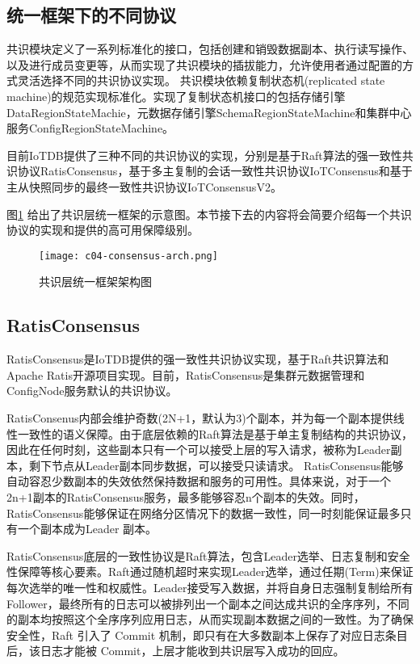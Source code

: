 \subsection{统一框架下的不同协议}

共识模块定义了一系列标准化的接口，包括创建和销毁数据副本、执行读写操作、以及进行成员变更等，从而实现了共识模块的插拔能力，允许使用者通过配置的方式灵活选择不同的共识协议实现。
共识模块依赖复制状态机\cite{lamport1978statemachine}(replicated state machine)的规范实现标准化。实现了复制状态机接口的包括存储引擎DataRegionStateMachie，元数据存储引擎SchemaRegionStateMachine和集群中心服务ConfigRegionStateMachine。

目前IoTDB提供了三种不同的共识协议的实现，分别是基于Raft算法的强一致性共识协议RatisConsensus，基于多主复制的会话一致性共识协议IoTConsensus和基于主从快照同步的最终一致性共识协议IoTConsensusV2。

图\ref{fig:c04-consensus-arch} 给出了共识层统一框架的示意图。本节接下去的内容将会简要介绍每一个共识协议的实现和提供的高可用保障级别。

\begin{figure}
  \centering
  \texttt{[image: c04-consensus-arch.png]}
  \caption{共识层统一框架架构图}
  \label{fig:c04-consensus-arch}
\end{figure}


\subsection{RatisConsensus}

RatisConsensus是IoTDB提供的强一致性共识协议实现，基于Raft共识算法和Apache Ratis\cite{ratis}开源项目实现。目前，RatisConsensus是集群元数据管理和ConfigNode服务默认的共识协议。

RatisConsenus内部会维护奇数(2N+1，默认为3)个副本，并为每一个副本提供线性一致性的语义保障。由于底层依赖的Raft算法是基于单主复制结构的共识协议，因此在任何时刻，这些副本只有一个可以接受上层的写入请求，被称为Leader副本，剩下节点从Leader副本同步数据，可以接受只读请求。
RatisConsensus能够自动容忍少数副本的失效依然保持数据和服务的可用性。具体来说，对于一个2n+1副本的RatisConsensus服务，最多能够容忍n个副本的失效。同时，RatisConsensus能够保证在网络分区情况下的数据一致性，同一时刻能保证最多只有一个副本成为Leader 副本。

RatisConsensus底层的一致性协议是Raft算法，包含Leader选举、日志复制和安全性保障等核心要素。Raft通过随机超时来实现Leader选举，通过任期(Term)来保证每次选举的唯一性和权威性。Leader接受写入数据，并将自身日志强制复制给所有Follower，最终所有的日志可以被排列出一个副本之间达成共识的全序序列，不同的副本均按照这个全序序列应用日志，从而实现副本数据之间的一致性。为了确保安全性，Raft 引入了 Commit 机制，即只有在大多数副本上保存了对应日志条目后，该日志才能被 Commit，上层才能收到共识层写入成功的回应。

